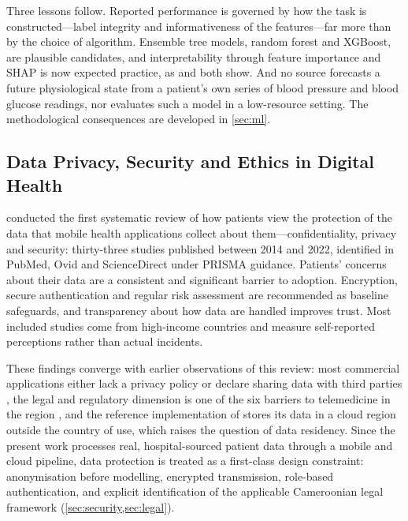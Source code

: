 Three lessons follow. Reported performance is governed by how the task is constructed---label integrity and informativeness of the features---far more than by the choice of algorithm. Ensemble tree models, random forest and XGBoost, are plausible candidates, and interpretability through feature importance and SHAP is now expected practice, as \textcite{mendoza2025} and \textcite{liu2025ppg} both show. And no source forecasts a future physiological state from a patient's own series of blood pressure and blood glucose readings, nor evaluates such a model in a low-resource setting. The methodological consequences are developed in \cref{sec:ml}.

\subsection{Data Privacy, Security and Ethics in Digital Health}\label{sec:lr-privacy}

\Textcite{alhammad2024} conducted the first systematic review of how patients view the protection of the data that mobile health applications collect about them---confidentiality, privacy and security: thirty-three studies published between 2014 and 2022, identified in PubMed, Ovid and ScienceDirect under PRISMA guidance. Patients' concerns about their data are a consistent and significant barrier to adoption. Encryption, secure authentication and regular risk assessment are recommended as baseline safeguards, and transparency about how data are handled improves trust. Most included studies come from high-income countries and measure self-reported perceptions rather than actual incidents.

These findings converge with earlier observations of this review: most commercial applications either lack a privacy policy or declare sharing data with third parties \parencite{alessa2019}, the legal and regulatory dimension is one of the six barriers to telemedicine in the region \parencite{dodoo2022}, and the reference implementation of \textcite{efendi2025} stores its data in a cloud region outside the country of use, which raises the question of data residency. Since the present work processes real, hospital-sourced patient data through a mobile and cloud pipeline, data protection is treated as a first-class design constraint: anonymisation before modelling, encrypted transmission, role-based authentication, and explicit identification of the applicable Cameroonian legal framework (\cref{sec:security,sec:legal}).


